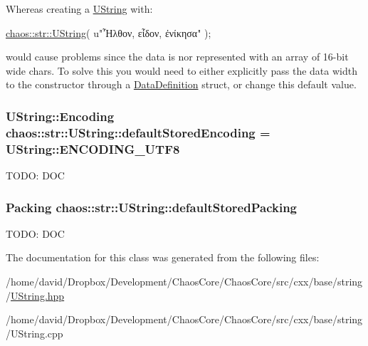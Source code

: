 Whereas creating a \hyperlink{classchaos_1_1str_1_1_u_string}{U\-String} with\-: 
\begin{DoxyCode}
\hyperlink{classchaos_1_1str_1_1_u_string}{chaos::str::UString}( u\textcolor{stringliteral}{"Ἦλθον, εἶδον, ἐνίκησα"} );
\end{DoxyCode}
 would cause problems since the data is nor represented with an array of 16-\/bit wide chars. To solve this you would need to either explicitly pass the data width to the constructor through a \hyperlink{structchaos_1_1str_1_1_u_string_1_1_data_definition}{Data\-Definition} struct, or change this default value. \hypertarget{classchaos_1_1str_1_1_u_string_aca40d2341d3b5011070beede74fb3c05}{
\subsubsection[{default\-Stored\-Encoding}]{\setlength{\rightskip}{0pt plus 5cm}U\-String\-::\-Encoding chaos\-::str\-::\-U\-String\-::default\-Stored\-Encoding = U\-String\-::\-E\-N\-C\-O\-D\-I\-N\-G\-\_\-\-U\-T\-F8\hspace{0.3cm}{\ttfamily [static]}}}\label{classchaos_1_1str_1_1_u_string_aca40d2341d3b5011070beede74fb3c05}
T\-O\-D\-O\-: D\-O\-C \hypertarget{classchaos_1_1str_1_1_u_string_a50b3a17a117ae0739d845489727745f5}{
\subsubsection[{default\-Stored\-Packing}]{\setlength{\rightskip}{0pt plus 5cm}Packing chaos\-::str\-::\-U\-String\-::default\-Stored\-Packing\hspace{0.3cm}{\ttfamily [static]}}}\label{classchaos_1_1str_1_1_u_string_a50b3a17a117ae0739d845489727745f5}
T\-O\-D\-O\-: D\-O\-C 

The documentation for this class was generated from the following files\-:\begin{DoxyCompactItemize}
\item 
/home/david/\-Dropbox/\-Development/\-Chaos\-Core/\-Chaos\-Core/src/cxx/base/string/\hyperlink{_u_string_8hpp}{U\-String.\-hpp}\item 
/home/david/\-Dropbox/\-Development/\-Chaos\-Core/\-Chaos\-Core/src/cxx/base/string/U\-String.\-cpp\end{DoxyCompactItemize}
